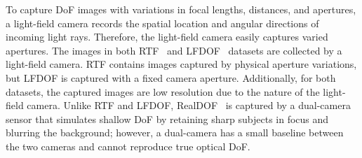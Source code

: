 
To capture DoF images with variations in focal lengths, distances, and apertures, a light-field camera records the spatial location and angular directions of incoming light rays. Therefore, the light-field camera easily captures varied apertures. The images in both RTF~\cite{d2016non} and LFDOF~\cite{ruan2021aifnet} datasets are collected by a light-field camera. RTF contains images captured by physical aperture variations, but LFDOF is captured with a fixed camera aperture. Additionally, for both datasets, the captured images are low resolution due to the nature of the light-field camera. Unlike RTF and LFDOF, RealDOF~\cite{lee2021iterative} is captured by a dual-camera sensor that simulates shallow DoF by retaining sharp subjects in focus and blurring the background; however, a dual-camera has a small baseline between the two cameras and cannot reproduce true optical DoF.


